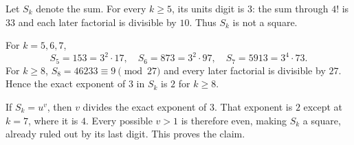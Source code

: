 Let $S_k$ denote the sum. For every $k\ge5$, its units digit is $3$: the sum through $4!$ is $33$ and each later factorial is divisible by $10$. Thus $S_k$ is not a square.

For $k=5,6,7$,
\[
S_5=153=3^2\cdot17,\quad
S_6=873=3^2\cdot97,\quad
S_7=5913=3^4\cdot73.
\]
For $k\ge8$, $S_8=46233\equiv9\pmod{27}$ and every later factorial is divisible by $27$. Hence the exact exponent of $3$ in $S_k$ is $2$ for $k\ge8$.

If $S_k=u^v$, then $v$ divides the exact exponent of $3$. That exponent is $2$ except at $k=7$, where it is $4$. Every possible $v>1$ is therefore even, making $S_k$ a square, already ruled out by its last digit. This proves the claim.
